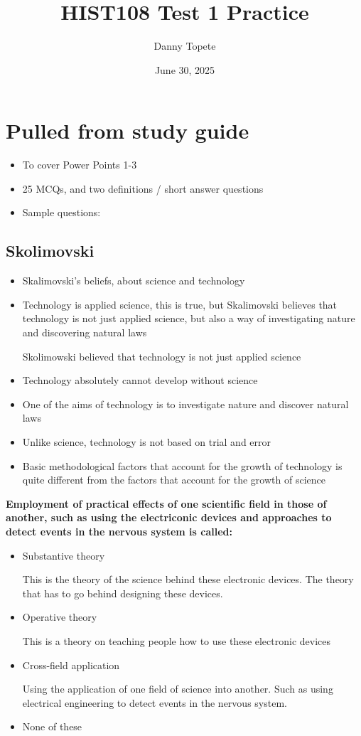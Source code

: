 \documentclass{article}
\title{HIST108 Test 1 Practice}
\author{Danny Topete}
\date{June 30, 2025}
\begin{document}
\maketitle

\section{Pulled from study guide}

\begin{itemize}
  \item To cover Power Points 1-3
  \item 25 MCQs, and two definitions / short answer questions
  \item Sample questions:
\end{itemize}

\subsection{Skolimovski}
\begin{itemize}
  \item Skalimovski's beliefs, about science and technology
  \item Technology is applied science, this is true, but Skalimovski
    believes that technology is not just applied science, but also a way of
    investigating nature and discovering natural laws

    Skolimowski believed that technology is not just applied science
  \item Technology absolutely cannot develop without science
  \item One of the aims of technology is to investigate nature and discover natural laws
  \item Unlike science, technology is not based on trial and error
  \item Basic methodological factors that account for the growth of technology is
    quite different from the factors that account for the growth of science
\end{itemize}

\newpage
\noindent \textbf{Employment of practical effects of one scientific field in those of another, such
as using the electriconic devices and approaches to detect
events in the nervous system is called:}
\begin{itemize}
  \item Substantive theory

    This is the theory of the science behind these electronic devices.
    The theory that has to go behind designing these devices.
  \item Operative theory

    This is a theory on teaching people how to use these electronic devices
  \item Cross-field application

    Using the application of one field of science into another.
    Such as using electrical engineering to detect events in the nervous system.
  \item None of these
\end{itemize}
\end{document}
